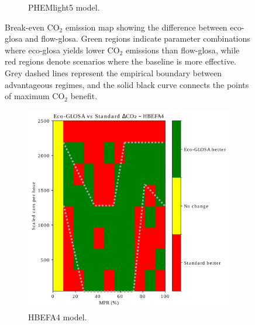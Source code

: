 \begin{figure}[htb]
\begin{subfigure}[b]{0.45\textwidth}
    \caption{PHEMlight5 model.}
    \label{fig:BE_EcoFlow_PHEM}
  \end{subfigure}
  \caption{Break-even CO$_2$ emission map showing the difference between \ac{eco-glosa} and \ac{flow-glosa}. Green regions indicate parameter combinations where \ac{eco-glosa} yields lower CO$_2$ emissions than \ac{flow-glosa}, while red regions denote scenarios where the baseline is more effective. Grey dashed lines represent the empirical boundary between advantageous regimes, and the solid black curve connects the points of maximum CO$_2$ benefit.}
  \label{fig:BE_EcoFlow}
\end{figure}

\begin{figure}[htb]
  \centering
  \begin{subfigure}[b]{0.45\textwidth}
    \includegraphics[width=\textwidth]{data/img/BreakEven/delta_CO2_HBEFA4.pdf}
    \caption{HBEFA4 model.}
    \label{fig:BE_EcoStd_HBEFA4}
  \end{subfigure}\hfill
  \begin{subfigure}[b]{0.45\textwidth}

\end{subfigure}
\end{figure}
